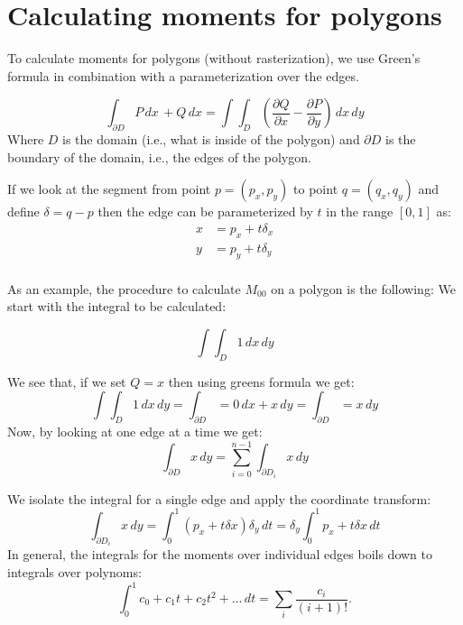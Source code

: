 \documentclass{article}
\begin{document}
\section{Calculating moments for polygons}
To calculate moments for polygons (without rasterization), we use Green's formula in combination with a parameterization over the edges.

\begin{equation}
  \int_{\partial D} P\,dx\,+Q\,dx = \int\int_D\left(\frac{\partial Q}{\partial x} - \frac{\partial P}{\partial y}\right)\,dx\,dy
\end{equation}
Where $D$ is the domain (i.e., what is inside of the polygon) and $\partial D$ is the boundary of the domain, i.e., the edges of the polygon.

If we look at the segment from point $p=(p_x, p_y)$ to point $q=(q_x, q_y)$ and define $\delta = q-p$ then the edge can be parameterized by $t$ in the range $[0, 1]$ as:
\begin{align}
  x & = p_x + t\delta_x \\
  y & = p_y + t\delta_y \\
 \end{align}

As an example, the procedure to calculate $M_{00}$ on a polygon is the following: We start with the integral to be calculated:

\begin{equation}
  \int\int_D 1\,dx\,dy
  \end{equation}

We see that, if we set $Q=x$ then using greens formula we get:
\begin{equation}
  \int\int_D 1\,dx\,dy = \int_{\partial D} = 0\,dx + x\,dy = \int_{\partial D} = x\,dy
\end{equation}
Now, by looking at one edge at a time we get:
\begin{equation}
  \int_{\partial D} x\,dy = \sum_{i=0}^{n-1} \int_{\partial D_i} x\,dy
\end{equation}

We isolate the integral for a single edge and apply the coordinate transform:
\begin{equation}
  \int_{\partial D_i} x\,dy = \int_{0}^{1}(p_x+t\delta x)\delta_y\,dt
  = \delta_y\int_{0}^{1}p_x+t\delta x\,dt
\end{equation}
In general, the integrals for the moments over individual edges boils down to integrals over polynoms:
\begin{equation}
  \int_0^1 c_0 + c_1t+c_2t^2+...\,dt = \sum_i \frac{c_i}{(i+1)!}.
\end{equation}
\end{document}
